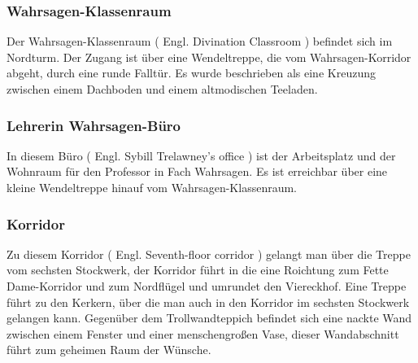\documentclass[a4paper, 10pt]{article}
\begin{document}
\subsubsection*{\large Wahrsagen-Klassenraum}
Der Wahrsagen-Klassenraum (  Engl.  Divination Classroom ) befindet sich im Nordturm. Der Zugang ist über eine Wendeltreppe, die vom Wahrsagen-Korridor abgeht, durch eine runde Falltür. Es wurde beschrieben als eine Kreuzung zwischen einem Dachboden und einem altmodischen Teeladen.
\subsubsection*{\large Lehrerin Wahrsagen-Büro}
In diesem Büro (  Engl.  Sybill Trelawney's office ) ist der Arbeitsplatz und der Wohnraum für den Professor in Fach Wahrsagen. Es ist erreichbar über eine kleine Wendeltreppe hinauf vom Wahrsagen-Klassenraum.
\subsubsection*{\large Korridor}
Zu diesem Korridor (  Engl.  Seventh-floor corridor ) gelangt man über die Treppe vom sechsten Stockwerk, der Korridor führt in die eine Roichtung zum Fette Dame-Korridor und zum Nordflügel und umrundet den Viereckhof. Eine Treppe führt zu den Kerkern, über die man auch in den Korridor im sechsten Stockwerk gelangen kann. Gegenüber dem Trollwandteppich befindet sich eine nackte Wand zwischen einem Fenster und einer menschengroßen Vase, dieser Wandabschnitt führt zum geheimen Raum der Wünsche.
\end{document}
